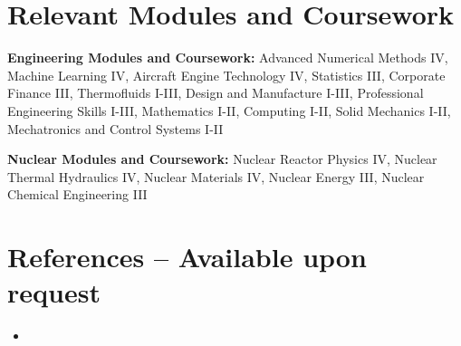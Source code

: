 \documentclass[letterpaper,11pt]{article}
\newcommand{\resumeItem}[1]{
  \item\small{
    {#1 \vspace{-2pt}}
  }
}
\newcommand{\resumeSubHeadingListStart}{\begin{itemize}[leftmargin=0.15in, label={}]}
\newcommand{\resumeSubHeadingListEnd}{\end{itemize}}
\begin{document}

\section{Relevant Modules and Coursework}
  \vspace{2pt}
  \resumeSubHeadingListStart
    \small{\item{
        \textbf{Engineering Modules and Coursework:}{ Advanced Numerical Methods IV, Machine Learning IV, Aircraft Engine Technology IV, Statistics III, Corporate Finance III, Thermofluids I-III, Design and Manufacture I-III, Professional Engineering Skills I-III, Mathematics I-II, Computing I-II, Solid Mechanics I-II, Mechatronics and Control Systems I-II} \\ \vspace{-0.17in}        
        
        \textbf{Nuclear Modules and Coursework:}{ Nuclear Reactor Physics IV, Nuclear Thermal Hydraulics IV, Nuclear Materials IV, Nuclear Energy III, Nuclear Chemical Engineering III} \\ \vspace{-0.17in}        
    }}
  \resumeSubHeadingListEnd

  

\section{\hspace*{\fill}References – Available upon request\hspace*{\fill}}
  \resumeSubHeadingListStart
    \resumeItem{}
  \resumeSubHeadingListEnd



\end{document}
